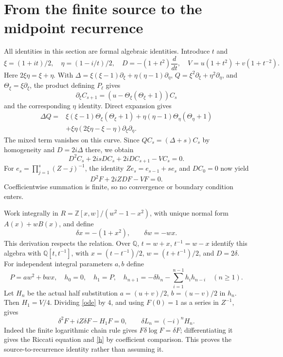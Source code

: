 \documentclass[11pt]{article}
\newcommand{\Z}{\mathbb Z}\newcommand{\Q}{\mathbb Q}
\begin{document}
\newpage
\section{From the finite source to the midpoint recurrence}
All identities in this section are formal algebraic identities. Introduce $t$ and
\[
 \xi=(1+it)/2,\quad \eta=(1-i/t)/2,\quad
 D=-(1+t^2)\frac{d}{dt},\quad V=u(1+t^2)+v(1+t^{-2}).
\]
Here $2\xi\eta=\xi+\eta$. With
$\Delta=\xi(\xi-1)\partial_\xi+\eta(\eta-1)\partial_\eta$,
$Q=\xi^2\partial_\xi+\eta^2\partial_\eta$, and $\Theta_\xi=\xi\partial_\xi$, the product defining $P_\ell$ gives
\[
 \partial_\xi C_{s+1}=(u-\Theta_\xi(\Theta_\xi+1))C_s
\]
and the corresponding $\eta$ identity. Direct expansion gives
\begin{align*}
 \Delta Q={}&\xi(\xi-1)\Theta_\xi(\Theta_\xi+1)
 +\eta(\eta-1)\Theta_\eta(\Theta_\eta+1)\\
 &+\xi\eta(2\xi\eta-\xi-\eta)\partial_\xi\partial_\eta.
\end{align*}
The mixed term vanishes on this curve. Since $Q C_s=(\Delta+s)C_s$ by homogeneity and $D=2i\Delta$ there, we obtain
\[
 D^2C_s+2isDC_s+2iDC_{s+1}-VC_s=0.
\]
For $e_s=\prod_{j=1}^s(Z-j)^{-1}$, the identity $Ze_s=e_{s-1}+se_s$ and $DC_0=0$ now yield
\begin{equation}\label{ode} D^2F+2iZDF-VF=0.\end{equation}
Coefficientwise summation is finite, so no convergence or boundary condition enters.

Work integrally in $R=\Z[x,w]/(w^2-1-x^2)$, with unique normal form $A(x)+wB(x)$, and define
\[
 \delta x=-(1+x^2),\qquad \delta w=-wx.
\]
This derivation respects the relation. Over $\Q$, $t=w+x$, $t^{-1}=w-x$ identify this algebra with $\Q[t,t^{-1}]$, with $x=(t-t^{-1})/2$, $w=(t+t^{-1})/2$, and $D=2\delta$.
For independent integral parameters $a,b$ define
\begin{equation}\label{h}
 P=aw^2+bwx,\quad h_0=0,\quad h_1=P,\quad
 h_{n+1}=-\delta h_n-\sum_{i=1}^{n-1}h_i h_{n-i}\quad(n\ge1).
\end{equation}
Let $H_n$ be the actual half substitution $a=(u+v)/2$, $b=(u-v)/2$ in $h_n$. Then $H_1=V/4$. Dividing \eqref{ode} by $4$, and using $F(0)=1$ as a series in $Z^{-1}$, gives
\[
 \delta^2F+iZ\delta F-H_1F=0,\qquad
 \delta L_n=(-i)^n H_n.
\]
Indeed the finite logarithmic chain rule gives $F\delta\log F=\delta F$; differentiating it gives the Riccati equation and \eqref{h} by coefficient comparison. This proves the source-to-recurrence identity rather than assuming it.
\end{document}
